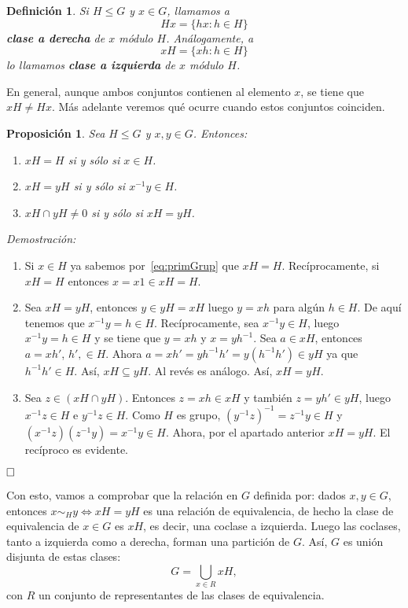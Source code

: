 \documentclass[12pt]{article}
\newtheorem{proposition}[theorem]{Proposición}
\newtheorem{definition}[theorem]{Definición}
\begin{document}
\begin{definition}Si $H \leq G$ y $x \in G$, llamamos a $$Hx = \lbrace hx : h \in H \rbrace$$ \textbf{clase a derecha} de $x$ módulo $H$. Análogamente, a $$xH = \lbrace xh : h \in H \rbrace$$ lo llamamos \textbf{clase a izquierda} de $x$ módulo $H$. 
\end{definition}

En general, aunque ambos conjuntos contienen al elemento $x$, se tiene que $xH \neq Hx$. Más adelante veremos qué ocurre cuando estos conjuntos coinciden.

\begin{proposition}\label{eq:partiGrupo} Sea $H \leq G$ y $x,y \in G$. Entonces: \begin{enumerate}
\item $xH = H$ si y sólo si $x \in H$.
\item $xH = yH$ si y sólo si $x^{-1}y \in H$.
\item $xH \cap yH \neq 0$ si y sólo si $xH = yH$.
\end{enumerate}
\end{proposition}
\emph{Demostración: }\begin{enumerate}
\item Si $x \in H$ ya sabemos por~\ref{eq:primGrup} que $xH = H$. Recíprocamente, si $xH = H$ entonces $x = x1 \in xH = H$.
\item Sea $xH = yH$, entonces $y \in yH = xH$ luego $y = xh$ para algún $h \in H$. De aquí tenemos que $x^{-1}y = h \in H$. Recíprocamente, sea $x^{-1}y \in H$, luego $x^{-1}y = h \in H$ y se tiene que $y = xh$ y $x = yh^{-1}$. Sea $a \in xH$, entonces $a = xh'$, $h' ,\in H$. Ahora $a = xh' = yh^{-1}h' = y(h^{-1}h') \in yH$ ya que $h^{-1}h' \in H$. Así, $xH \subseteq yH$. Al revés es análogo. Así, $xH = yH$.
\item Sea $z \in (xH \cap yH)$. Entonces $z = xh \in xH$ y también $z= yh' \in yH$, luego $x^{-1}z \in H$ e $y^{-1}z \in H$. Como $H$ es grupo, $(y^{-1}z)^{-1} = z^{-1}y \in H$ y $(x^{-1}z)(z^{-1}y) = x^{-1}y \in H$. Ahora, por el apartado anterior $xH = yH$. El recíproco es evidente.
\end{enumerate}

$\hfill \square$

Con esto, vamos a comprobar que la relación en $G$ definida por: dados $x,y \in G$, entonces $x\sim_{H} y \Longleftrightarrow xH = yH$ es una relación de equivalencia, de hecho la clase de equivalencia de $x \in G$ es $xH$, es decir, una coclase a izquierda. Luego las coclases, tanto a izquierda como a derecha, forman una partición de $G$. Así, $G$ es unión disjunta de estas clases: $$G = \bigcup_{x \in R} xH,$$ con $R$ un conjunto de representantes de las clases de equivalencia.
\end{document}
